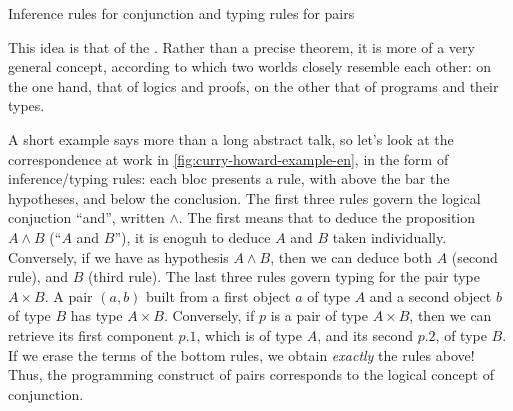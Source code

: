 \begin{marginfigure}




  
  \caption{Inference rules for conjunction and typing rules for pairs}
  \label{fig:curry-howard-example-en}
\end{marginfigure}

This idea is that of the . Rather than a precise theorem,
it is more of a very general concept, according to which two worlds closely resemble each
other: on the one hand, that of logics and proofs, on the other that of programs
and their types.

A short example says more than a long abstract talk, so let’s look at the correspondence
at work in \cref{fig:curry-howard-example-en}, in the form of inference/typing rules:
each bloc presents a rule, with above the bar the hypotheses, and below the conclusion.
The first three rules govern the logical conjuction “and”, written $\wedge$.
The first means that to deduce the proposition $A \wedge B$ (“$A$ and $B$”), it is enoguh
to deduce $A$ and $B$ taken individually.
Conversely, if we have as hypothesis $A \wedge B$, then we can deduce both $A$ (second rule),
and $B$ (third rule).
The last three rules govern typing%
for the pair type $A \times B$. A pair $(a,b)$ built
from a first object $a$ of type $A$ and a second object $b$ of type $B$ has type $A \times B$.
Conversely, if $p$ is a pair of type $A \times B$, then we can retrieve its first component
$p.1$, which is of type $A$, and its second $p.2$, of type $B$.
If we erase the terms%
of the bottom rules, we obtain \emph{exactly} the rules above!
Thus, the programming construct of pairs corresponds to the logical concept of conjunction.

